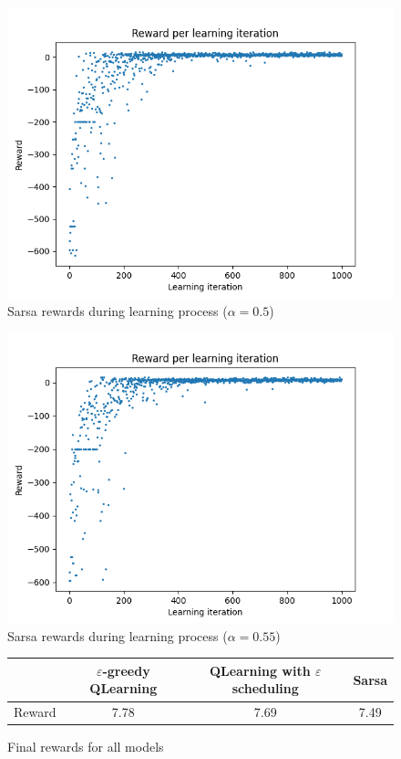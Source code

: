 \documentclass[11pt]{article}
\def\sarsaalph{0.55}
\begin{document}
\begin{figure}[H]
	\centering
	\includegraphics[width=12cm]{../figures/part_3/learning_reward_base_sarsa.png}
	\caption{Sarsa rewards during learning process ($\alpha = 0.5$)}
	\label{fig:sarsa_base_reward}
\end{figure}

\begin{figure}[H]
	\centering
	\includegraphics[width=12cm]{../figures/part_3/learning_reward_optimized_sarsa.png}
	\caption{Sarsa rewards during learning process ($\alpha = \sarsaalph$)}
	\label{fig:sarsa_optimized_reward}
\end{figure}

\begin{figure}[H]
	\centering
	\begin{tabular}{c | c | c | c}
		& $\varepsilon$-greedy QLearning	& QLearning with $\varepsilon$ scheduling	& Sarsa \\
		\hline
		Reward	& 7.78 & 7.69 & 7.49
	\end{tabular}
	\caption{Final rewards for all models}
	\label{fig:final_rewards}
\end{figure}
\end{document}

